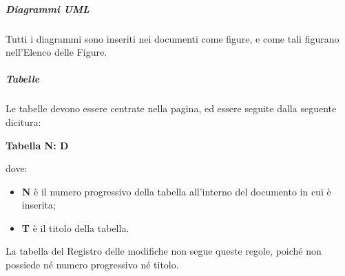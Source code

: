 \documentclass[../norme-di-progetto.tex]{subfiles}
\begin{document}
\subparagraph{Diagrammi UML}
Tutti i diagrammi  sono inseriti nei documenti come figure, e come tali figurano nell'Elenco delle Figure.

\subparagraph{Tabelle}
Le tabelle devono essere centrate nella pagina, ed essere seguite dalla seguente dicitura: \\ \begin{center}
  \centering
  \textbf{Tabella N: D}
\end{center} dove:
\begin{itemize}
  \item \textbf{N} è il numero progressivo della tabella all'interno del documento in cui è inserita;
  \item \textbf{T} è il titolo della tabella.
\end{itemize}
La tabella del Registro delle modifiche non segue queste regole, poiché non possiede né numero progressivo né titolo.
\end{document}
